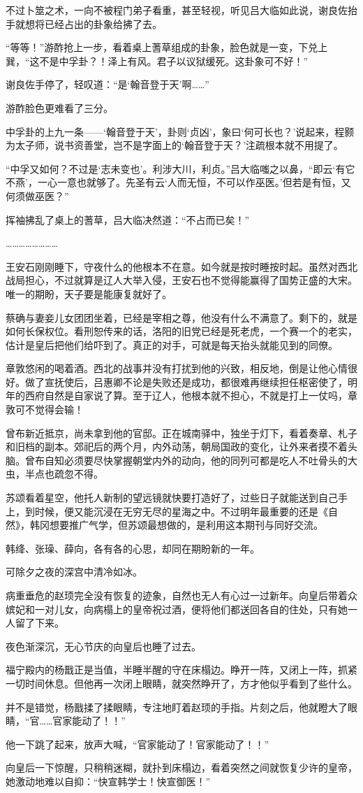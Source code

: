 不过卜筮之术，一向不被程门弟子看重，甚至轻视，听见吕大临如此说，谢良佐抬手就想将已经占出的卦象给拂了去。

“等等！”游酢抢上一步，看着桌上蓍草组成的卦象，脸色就是一变，下兑上巽，“这不是中孚卦？！泽上有风。君子以议狱缓死。这卦象可不好！”

谢良佐手停了，轻叹道：“是‘翰音登于天’啊……”

游酢脸色更难看了三分。

中孚卦的上九一条——‘翰音登于天’，卦则‘贞凶’，象曰‘何可长也？’说起来，程颢为太子师，说书资善堂，岂不是字面上的‘翰音登于天？’注疏根本就不用提了。

“中孚又如何？不过是‘志未变也’。利涉大川，利贞。”吕大临嗤之以鼻，“即云‘有它不燕’，一心一意也就够了。先圣有云‘人而无恒，不可以作巫医。’但若是有恒，又何须做巫医？”

挥袖拂乱了桌上的蓍草，吕大临决然道：“不占而已矣！”

……………………

王安石刚刚睡下，守夜什么的他根本不在意。如今就是按时睡按时起。虽然对西北战局担心，不过就算是辽人大举入侵，王安石也不觉得能赢得了国势正盛的大宋。唯一的期盼，天子要是能康复就好了。

蔡确与妻妾儿女团团坐着，已经是宰相之尊，他没有什么不满意了。剩下的，就是如何长保权位。看刑恕传来的话，洛阳的旧党已经是死老虎，一个赛一个的老实，估计是皇后把他们给吓到了。真正的对手，可就是每天抬头就能见到的同僚。

章敦悠闲的喝着酒。西北的战事并没有打扰到他的兴致，相反地，倒是让他心情很好。做了宣抚使后，吕惠卿不论是失败还是成功，都很难再继续担任枢密使了，明年的西府自然是自家说了算。至于辽人，他根本就不担心，不就是打上一仗吗，章敦可不觉得会输！

曾布新近抵京，尚未拿到他的官邸。正在城南驿中，独坐于灯下，看着奏章、札子和旧档的副本。郊祀后的两个月，内外动荡，朝局国政的变化，让外来者摸不着头脑。曾布自知必须要尽快掌握朝堂内外的动向，他的同列可都是吃人不吐骨头的大虫，半点也疏忽不得。

苏颂看着星空，他托人新制的望远镜就快要打造好了，过些日子就能送到自己手上，到时候，便又能沉浸在无穷无尽的星海之中。不过明年最重要的还是《自然》，韩冈想要推广气学，但苏颂最想做的，是利用这本期刊与同好交流。

韩绛、张璪、薛向，各有各的心思，却同在期盼新的一年。

可除夕之夜的深宫中清冷如冰。

病重垂危的赵顼完全没有恢复的迹象，自然也无人有心过一过新年。向皇后带着众嫔妃和一对儿女，向病榻上的皇帝祝过酒，便将他们都送回各自的住处，只有她一人留了下来。

夜色渐深沉，无心节庆的向皇后也睡了过去。

福宁殿内的杨戬正是当值，半睡半醒的守在床榻边。睁开一阵，又闭上一阵，抓紧一切时间休息。但他再一次闭上眼睛，就突然睁开了，方才他似乎看到了些什么。

并不是错觉，杨戬揉了揉眼睛，专注地盯着赵顼的手指。片刻之后，他就瞪大了眼睛，“官……官家能动了！！”

他一下跳了起来，放声大喊，“官家能动了！官家能动了！！”

向皇后一下惊醒，只稍稍迷糊，就扑到床榻边，看着突然之间就恢复少许的皇帝，她激动地难以自抑：“快宣韩学士！快宣御医！”

